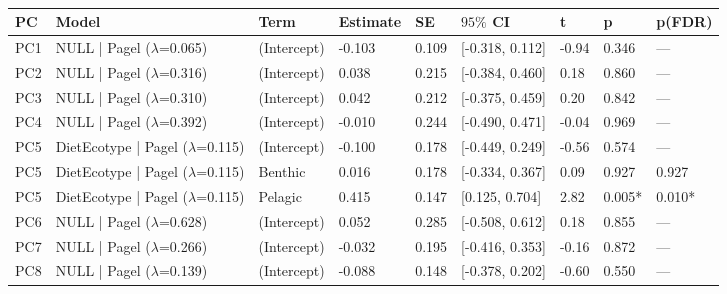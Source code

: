 \begin{table}[!h]
\centering
\caption{}
\centering
\begin{tabular}[t]{lllllllll}
\toprule
PC & Model & Term & Estimate & SE & $95\%$ CI & t & p & p(FDR)\\
\midrule
PC1 & NULL | Pagel ($\lambda$=0.065) & (Intercept) & -0.103 & 0.109 & {}[-0.318, 0.112] & -0.94 & 0.346 & ---\\
PC2 & NULL | Pagel ($\lambda$=0.316) & (Intercept) & 0.038 & 0.215 & {}[-0.384, 0.460] & 0.18 & 0.860 & ---\\
PC3 & NULL | Pagel ($\lambda$=0.310) & (Intercept) & 0.042 & 0.212 & {}[-0.375, 0.459] & 0.20 & 0.842 & ---\\
PC4 & NULL | Pagel ($\lambda$=0.392) & (Intercept) & -0.010 & 0.244 & {}[-0.490, 0.471] & -0.04 & 0.969 & ---\\
PC5 & DietEcotype | Pagel ($\lambda$=0.115) & (Intercept) & -0.100 & 0.178 & {}[-0.449, 0.249] & -0.56 & 0.574 & ---\\
\addlinespace
PC5 & DietEcotype | Pagel ($\lambda$=0.115) & Benthic & 0.016 & 0.178 & {}[-0.334, 0.367] & 0.09 & 0.927 & 0.927\\
PC5 & DietEcotype | Pagel ($\lambda$=0.115) & Pelagic & 0.415 & 0.147 & {}[0.125, 0.704] & 2.82 & 0.005* & 0.010*\\
PC6 & NULL | Pagel ($\lambda$=0.628) & (Intercept) & 0.052 & 0.285 & {}[-0.508, 0.612] & 0.18 & 0.855 & ---\\
PC7 & NULL | Pagel ($\lambda$=0.266) & (Intercept) & -0.032 & 0.195 & {}[-0.416, 0.353] & -0.16 & 0.872 & ---\\
PC8 & NULL | Pagel ($\lambda$=0.139) & (Intercept) & -0.088 & 0.148 & {}[-0.378, 0.202] & -0.60 & 0.550 & ---\\
\bottomrule
\end{tabular}
\end{table}
